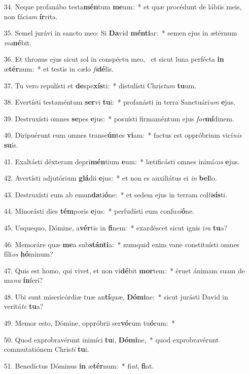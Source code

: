 34. Neque profanábo testa\textbf{mén}tum \textbf{me}um:~*  et quæ procédunt de lábiis meis, non fáci\textit{am} \textbf{ír}rita.\

35. Semel jurávi in sancto meo: Si \textbf{Da}vid \textbf{mén}\textbf{ti}ar:~*  semen ejus in ætérnum \textit{ma}\textbf{né}bit.\

36. Et thronus ejus sicut sol in conspéctu meo, \dag\  et sicut luna perfécta \textbf{in} æ\textbf{tér}num:~*  et testis in cælo \textit{fi}\textbf{dé}lis.\

37. Tu vero repulísti et \textbf{de}spe\textbf{xís}ti:~*  distulísti Chris\textit{tum} \textbf{tu}um.\

38. Evertísti testaméntum \textbf{ser}vi \textbf{tu}i:~*  profanásti in terra Sanctuári\textit{um} \textbf{e}jus.\

39. Destruxísti omnes \textbf{se}pes \textbf{e}jus:~*  posuísti firmaméntum ejus \textit{for}\textbf{mí}dinem.\

40. Diripuérunt eum omnes transe\textbf{ún}tes \textbf{vi}am:~*  factus est oppróbrium vicí\textit{nis} \textbf{su}is.\

41. Exaltásti déxteram depri\textbf{mén}tium \textbf{e}um:~*  lætificásti omnes inimí\textit{cos} \textbf{e}jus.\

42. Avertísti adjutórium \textbf{glá}dii \textbf{e}jus:~*  et non es auxiliátus ei \textit{in} \textbf{bel}lo.\

43. Destruxísti eum ab emun\textbf{da}ti\textbf{ó}ne:~*  et sedem ejus in terram col\textit{li}\textbf{sís}ti.\

44. Minorásti dies \textbf{tém}poris \textbf{e}jus:~*  perfudísti eum confu\textit{si}\textbf{ó}ne.\

45. Usquequo, Dómine, a\textbf{vér}tis in \textbf{fi}nem:~*  exardéscet sicut ignis i\textit{ra} \textbf{tu}a?\

46. Memoráre quæ \textbf{me}a sub\textbf{stán}\textbf{ti}a:~*  numquid enim vane constituísti omnes fíli\textit{os} \textbf{hó}minum?\

47. Quis est homo, qui vivet, et non vi\textbf{dé}bit \textbf{mor}tem:~*  éruet ánimam suam de ma\textit{nu} \textbf{ín}feri?\

48. Ubi sunt misericórdiæ tuæ an\textbf{tí}quæ, \textbf{Dó}\textbf{mi}ne:~*  sicut jurásti David in veritá\textit{te} \textbf{tu}a?\

49. Memor esto, Dómine, oppróbrii ser\textbf{vó}rum tu\textbf{ó}rum:~*  \

50. Quod exprobravérunt inimíci \textbf{tu}i, \textbf{Dó}\textbf{mi}ne,~*  quod exprobravérunt commutatiónem Chris\textit{ti} \textbf{tu}i.\

51. Benedíctus Dóminus \textbf{in} æ\textbf{tér}num:~*  fi\textit{at}, \textbf{fi}at.\

